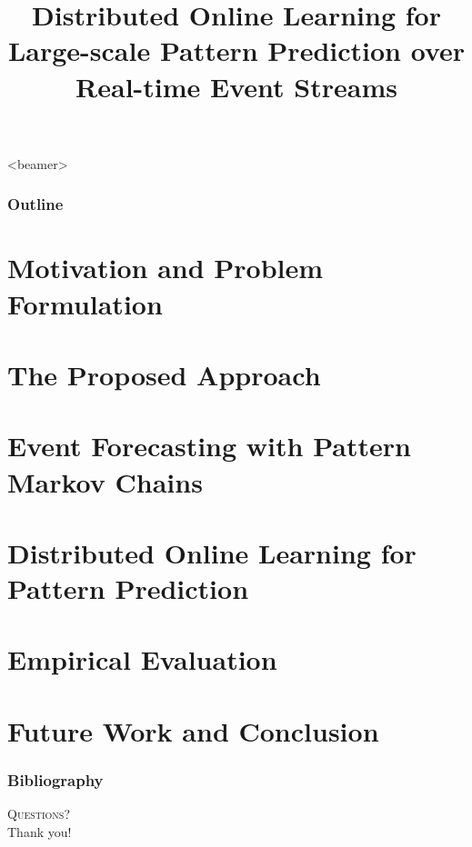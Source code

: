 \documentclass{beamer}
\title{	Distributed Online Learning for Large-scale Pattern Prediction over Real-time Event Streams}
\begin{document}



	\begin{frame}<beamer>
		\frametitle{Outline}
		\tableofcontents
	\end{frame}


\section{Motivation and Problem Formulation}

\section{The Proposed Approach}

\section{Event Forecasting with Pattern Markov Chains}

\section{Distributed Online Learning for Pattern Prediction}

\section{Empirical Evaluation}

\section{Future Work and Conclusion}




\begin{frame}[allowframebreaks]
	\frametitle{Bibliography}
	 
	
	
\end{frame}


\begin{frame}
	
	\centering
	
	\textsc{\Large Questions?}\\[1.5cm]
	
	Thank you!
\end{frame}
\end{document}
